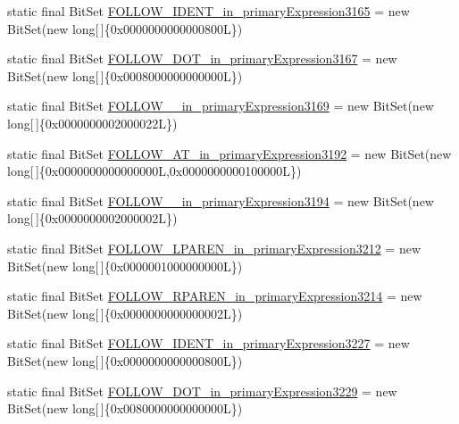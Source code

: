 \begin{DoxyCompactItemize}
static final Bit\-Set \hyperlink{classorg_1_1tzi_1_1use_1_1parser_1_1soil_1_1_soil_parser_aeaa1ebadaa66e7fb56687c3559a606d3}{F\-O\-L\-L\-O\-W\-\_\-\-I\-D\-E\-N\-T\-\_\-in\-\_\-primary\-Expression3165} = new Bit\-Set(new long\mbox{[}$\,$\mbox{]}\{0x0000000000000800\-L\})
\item 
static final Bit\-Set \hyperlink{classorg_1_1tzi_1_1use_1_1parser_1_1soil_1_1_soil_parser_aae05ffe93179bc936a69d289f30a2327}{F\-O\-L\-L\-O\-W\-\_\-\-D\-O\-T\-\_\-in\-\_\-primary\-Expression3167} = new Bit\-Set(new long\mbox{[}$\,$\mbox{]}\{0x0008000000000000\-L\})
\item 
static final Bit\-Set \hyperlink{classorg_1_1tzi_1_1use_1_1parser_1_1soil_1_1_soil_parser_ae3a003bbff45cec40e59c81860857e73}{F\-O\-L\-L\-O\-W\-\_\-\_\-in\-\_\-primary\-Expression3169} = new Bit\-Set(new long\mbox{[}$\,$\mbox{]}\{0x0000000002000022\-L\})
\item 
static final Bit\-Set \hyperlink{classorg_1_1tzi_1_1use_1_1parser_1_1soil_1_1_soil_parser_a735cbefc3a5b63d4de849e63097c3249}{F\-O\-L\-L\-O\-W\-\_\-\-A\-T\-\_\-in\-\_\-primary\-Expression3192} = new Bit\-Set(new long\mbox{[}$\,$\mbox{]}\{0x0000000000000000\-L,0x0000000000100000\-L\})
\item 
static final Bit\-Set \hyperlink{classorg_1_1tzi_1_1use_1_1parser_1_1soil_1_1_soil_parser_acc0fe8619494ab2fc6d03edd34213554}{F\-O\-L\-L\-O\-W\-\_\-\_\-in\-\_\-primary\-Expression3194} = new Bit\-Set(new long\mbox{[}$\,$\mbox{]}\{0x0000000002000002\-L\})
\item 
static final Bit\-Set \hyperlink{classorg_1_1tzi_1_1use_1_1parser_1_1soil_1_1_soil_parser_abadf7742d783958458be94759ff0d1b8}{F\-O\-L\-L\-O\-W\-\_\-\-L\-P\-A\-R\-E\-N\-\_\-in\-\_\-primary\-Expression3212} = new Bit\-Set(new long\mbox{[}$\,$\mbox{]}\{0x0000001000000000\-L\})
\item 
static final Bit\-Set \hyperlink{classorg_1_1tzi_1_1use_1_1parser_1_1soil_1_1_soil_parser_a945110b323bbe6192745d709c9396a03}{F\-O\-L\-L\-O\-W\-\_\-\-R\-P\-A\-R\-E\-N\-\_\-in\-\_\-primary\-Expression3214} = new Bit\-Set(new long\mbox{[}$\,$\mbox{]}\{0x0000000000000002\-L\})
\item 
static final Bit\-Set \hyperlink{classorg_1_1tzi_1_1use_1_1parser_1_1soil_1_1_soil_parser_ac7e61cb271c802859233441571dd3210}{F\-O\-L\-L\-O\-W\-\_\-\-I\-D\-E\-N\-T\-\_\-in\-\_\-primary\-Expression3227} = new Bit\-Set(new long\mbox{[}$\,$\mbox{]}\{0x0000000000000800\-L\})
\item 
static final Bit\-Set \hyperlink{classorg_1_1tzi_1_1use_1_1parser_1_1soil_1_1_soil_parser_a6bb5a3631042fce869582b22f0cc1b2f}{F\-O\-L\-L\-O\-W\-\_\-\-D\-O\-T\-\_\-in\-\_\-primary\-Expression3229} = new Bit\-Set(new long\mbox{[}$\,$\mbox{]}\{0x0080000000000000\-L\})

\end{DoxyCompactItemize}
